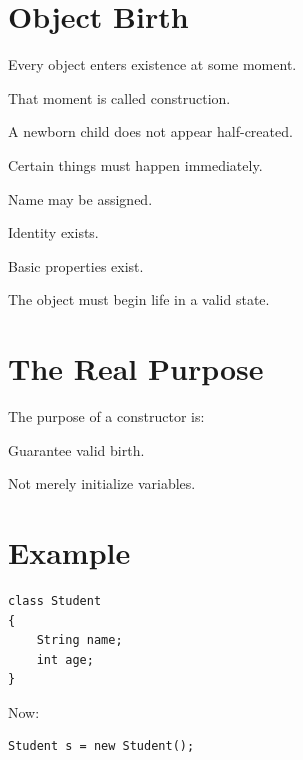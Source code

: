 \documentclass[11pt,a4paper]{book}
\begin{document}
\section{Object Birth}

\begin{idea}

Every object enters existence at some moment.

That moment is called construction.

\end{idea}

\begin{mentalmodel}

A newborn child does not appear half-created.

Certain things must happen immediately.

Name may be assigned.

Identity exists.

Basic properties exist.

The object must begin life in a valid state.

\end{mentalmodel}


\section{The Real Purpose}

The purpose of a constructor is:

\begin{center}
Guarantee valid birth.
\end{center}

Not merely initialize variables.


\section{Example}

\begin{verbatim}
class Student
{
    String name;
    int age;
}
\end{verbatim}

Now:

\begin{verbatim}
Student s = new Student();
\end{verbatim}
\end{document}
